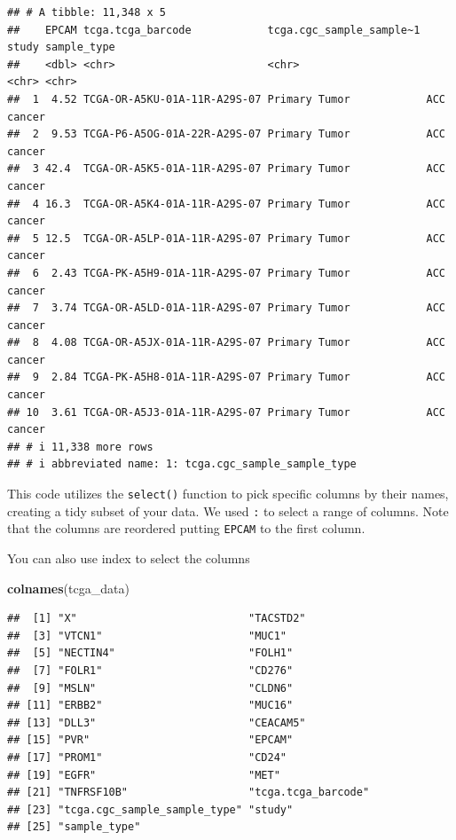 \documentclass[
]{book}
\newenvironment{Shaded}{\begin{snugshade}}{\end{snugshade}}
\newcommand{\FunctionTok}[1]{\textcolor[rgb]{0.13,0.29,0.53}{\textbf{#1}}}
\newcommand{\NormalTok}[1]{#1}
\begin{document}
\begin{verbatim}
## # A tibble: 11,348 x 5
##    EPCAM tcga.tcga_barcode            tcga.cgc_sample_sample~1 study sample_type
##    <dbl> <chr>                        <chr>                    <chr> <chr>      
##  1  4.52 TCGA-OR-A5KU-01A-11R-A29S-07 Primary Tumor            ACC   cancer     
##  2  9.53 TCGA-P6-A5OG-01A-22R-A29S-07 Primary Tumor            ACC   cancer     
##  3 42.4  TCGA-OR-A5K5-01A-11R-A29S-07 Primary Tumor            ACC   cancer     
##  4 16.3  TCGA-OR-A5K4-01A-11R-A29S-07 Primary Tumor            ACC   cancer     
##  5 12.5  TCGA-OR-A5LP-01A-11R-A29S-07 Primary Tumor            ACC   cancer     
##  6  2.43 TCGA-PK-A5H9-01A-11R-A29S-07 Primary Tumor            ACC   cancer     
##  7  3.74 TCGA-OR-A5LD-01A-11R-A29S-07 Primary Tumor            ACC   cancer     
##  8  4.08 TCGA-OR-A5JX-01A-11R-A29S-07 Primary Tumor            ACC   cancer     
##  9  2.84 TCGA-PK-A5H8-01A-11R-A29S-07 Primary Tumor            ACC   cancer     
## 10  3.61 TCGA-OR-A5J3-01A-11R-A29S-07 Primary Tumor            ACC   cancer     
## # i 11,338 more rows
## # i abbreviated name: 1: tcga.cgc_sample_sample_type
\end{verbatim}

This code utilizes the \texttt{select()} function to pick specific columns by their names, creating a tidy subset of your data. We used \texttt{:} to select a range of columns. Note that the columns are reordered
putting \texttt{EPCAM} to the first column.

You can also use index to select the columns

\begin{Shaded}
\begin{Highlighting}[]
\FunctionTok{colnames}\NormalTok{(tcga\_data)}
\end{Highlighting}
\end{Shaded}

\begin{verbatim}
##  [1] "X"                           "TACSTD2"                    
##  [3] "VTCN1"                       "MUC1"                       
##  [5] "NECTIN4"                     "FOLH1"                      
##  [7] "FOLR1"                       "CD276"                      
##  [9] "MSLN"                        "CLDN6"                      
## [11] "ERBB2"                       "MUC16"                      
## [13] "DLL3"                        "CEACAM5"                    
## [15] "PVR"                         "EPCAM"                      
## [17] "PROM1"                       "CD24"                       
## [19] "EGFR"                        "MET"                        
## [21] "TNFRSF10B"                   "tcga.tcga_barcode"          
## [23] "tcga.cgc_sample_sample_type" "study"                      
## [25] "sample_type"
\end{verbatim}
\end{document}
